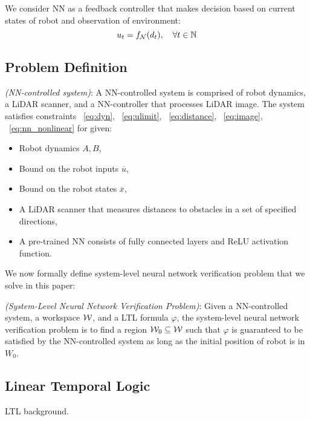 We consider NN as a feedback controller that makes decision based on current states of robot and observation of environment:
\begin{equation}    
    \label{eq:nn_nonlinear}    
    u_t = f_{\mathcal{N}}(d_t), \quad \forall t \in {\mathbb{N}}
\end{equation}    





\subsection{Problem Definition}

\begin{definition}
    \textit{(NN-controlled system)}: 
    A NN-controlled system is comprised of robot dynamics, a LiDAR scanner, and a NN-controller that processes LiDAR image.
    The system satisfies constraints ~\eqref{eq:dyn}, ~\eqref{eq:ulimit}, ~\eqref{eq:distance}, ~\eqref{eq:image}, ~\eqref{eq:nn_nonlinear}
    for given:
    \begin{itemize}
        \item Robot dynamics ${A, B}$,
        \item Bound on the robot inputs $\overline{u}$,
        \item Bound on the robot states $\overline{x}$,
        \item A LiDAR scanner that measures distances to obstacles in a set of specified directions,
        \item A pre-trained NN consists of fully connected layers and ReLU activation function.
    \end{itemize}
\end{definition}    


We now formally define system-level neural network verification problem that we solve in this paper:
\begin{definition}
    \textit{(System-Level Neural Network Verification Problem)}: Given a NN-controlled system, a workspace ${\mathcal{W}}$, 
    and a LTL formula $\varphi$, the system-level neural network verification problem is to find 
    a region ${\mathcal{W}}_0 \subseteq {\mathcal{W}}$ such that $\varphi$ is guaranteed to be satisfied by the NN-controlled system
    as long as the initial position of robot is in $W_0$.
\end{definition}    


\subsection{Linear Temporal Logic}

{\color{blue} LTL background.}



